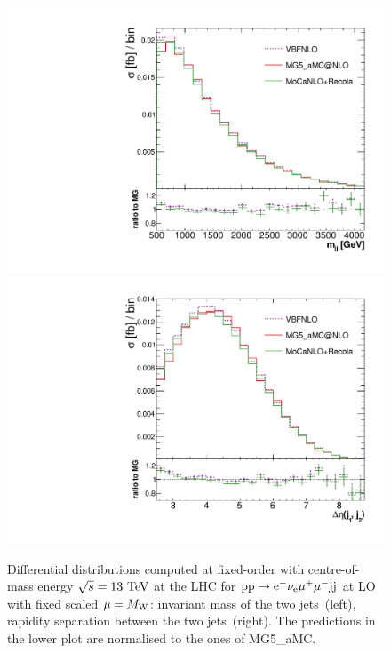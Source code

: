 \begin{figure}[htbp]
\begin{center}
   \includegraphics[scale=0.375]{figs/mjj_FixedOrder.pdf}
   \includegraphics[scale=0.375]{figs/dEtajj_FixedOrder.pdf}
\caption{Differential distributions computed at fixed-order with centre-of-mass energy $\sqrt{s}=13{\rm~TeV}$ at the LHC for ${\rm p} {\rm p}
  \to {\rm e}^-  \nu_{\rm e}  \mu^+ \mu^- {\rm j} {\rm j}$ at LO with fixed scaled $\mu = M_{\rm W}$: 
                invariant mass of the two jets~(left),
                rapidity separation between the two jets~(right).
                The predictions in the lower plot are normalised to the ones of {\sc MG5\_aMC}.
                }
\label{vbs_fig_fixed_order}
\end{center}
\end{figure}


